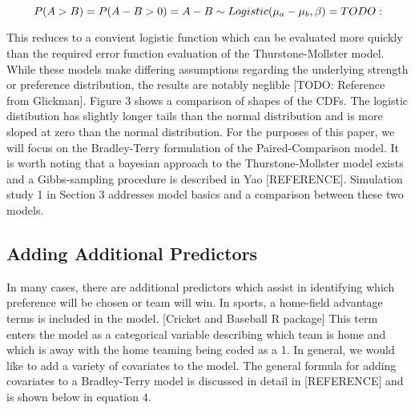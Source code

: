 \documentclass{article}
\begin{document}
\[ P(A > B) = P(A - B > 0)\\
            = A - B \sim Logistic(\mu_a - \mu_b, \beta)
            = TODO: \]
            

This reduces to a convient logistic function which can be evaluated more quickly than the required error function evaluation of the Thurstone-Mollster model. While these models make differing assumptions regarding the underlying strength or preference distribution, the results are notably neglible [TODO: Reference from Glickman]. Figure 3 shows a comparison of shapes of the CDFs. The logistic distibution has slightly longer tails than the normal distribution and is more sloped at zero than the normal distribution. For the purposes of this paper, we will focus on the Bradley-Terry formulation of the Paired-Comparison model. It is worth noting that a bayesian approach to the Thurstone-Mollster model exists and a Gibbs-sampling procedure is described in Yao [REFERENCE]. Simulation study 1 in Section 3 addresses model basics and a comparison between these two models.


\subsection{Adding Additional Predictors}

In many cases, there are additional predictors which assist in identifying which preference will be chosen or team will win. In sports, a home-field advantage terms is included in the model. [Cricket and Baseball R package] This term enters the model as a categorical variable describing which team is home and which is away with the home teaming being coded as a 1. In general, we would like to add a variety of covariates to the model. The general formula for adding covariates to a Bradley-Terry model is discussed in detail in [REFERENCE] and is shown below in equation 4. \cite{btm}


\printbibliography
\end{document}
